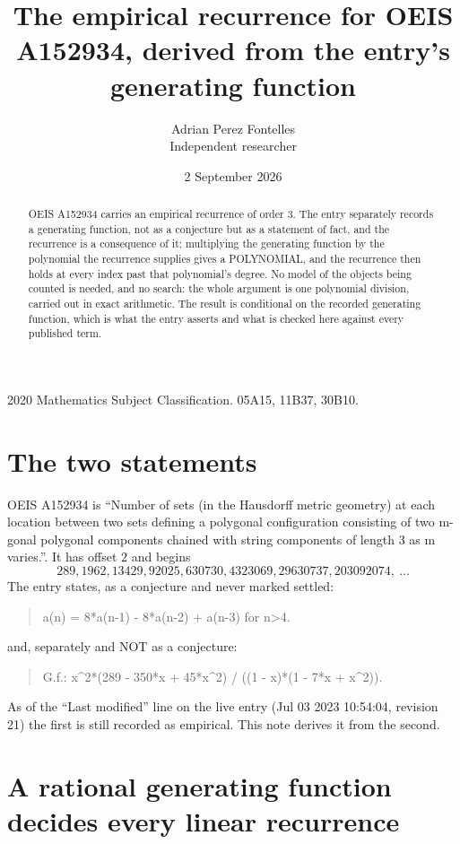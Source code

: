 \documentclass[11pt,a4paper]{article}
\title{The empirical recurrence for OEIS A152934, derived from the entry's generating function}
\author{Adrian Perez Fontelles\\ \small Independent researcher}
\date{2 September 2026}
\theoremstyle{plain}
\theoremstyle{definition}
\begin{document}
\maketitle

\begin{abstract}
OEIS A152934 carries an empirical recurrence of order $3$. The entry separately records a
generating function, not as a conjecture but as a statement of fact, and the recurrence is a
consequence of it: multiplying the generating function by the polynomial the recurrence
supplies gives a POLYNOMIAL, and the recurrence then holds at every index past that
polynomial's degree. No model of the objects being counted is needed, and no search: the
whole argument is one polynomial division, carried out in exact arithmetic. The result is
conditional on the recorded generating function, which is what the entry asserts and what is
checked here against every published term.
\end{abstract}

\noindent\small 2020 Mathematics Subject Classification. 05A15, 11B37, 30B10.\normalsize

\section{The two statements}

OEIS A152934 is ``Number of sets (in the Hausdorff metric geometry) at each location between two sets defining a polygonal configuration consisting of two m-gonal polygonal components chained with string components of length 3 as m varies.''. It has offset $2$ and begins
\[
289, 1962, 13429, 92025, 630730, 4323069, 29630737, 203092074,\ \dots
\]
The entry states, as a conjecture and never marked settled:
\begin{quote}
a(n) = 8*a(n-1) - 8*a(n-2) + a(n-3) for n>4.
\end{quote}
and, separately and NOT as a conjecture:
\begin{quote}
G.f.: x\^{}2*(289 - 350*x + 45*x\^{}2) / ((1 - x)*(1 - 7*x + x\^{}2)).
\end{quote}
As of the ``Last modified'' line on the live entry (Jul 03 2023 10:54:04, revision 21) the first is still
recorded as empirical. This note derives it from the second.

\section{A rational generating function decides every linear recurrence}
\end{document}
